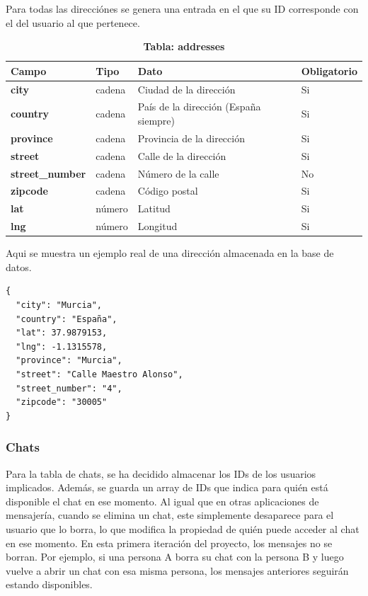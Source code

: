\documentclass[a4paper, 12pt]{article}
\begin{document}
Para todas las direcciónes se genera una entrada en el que su ID corresponde con el del usuario al que pertenece.

\begin{table}[H]
\captionsetup{justification=raggedright,singlelinecheck=false}
\caption{\textbf{Tabla: addresses}}
\label{tab:Addresses}
	\begin{tabular}{|m{3cm}|m{2cm}|m{5cm}|m{3cm}|}
	\hline
	\textbf{Campo} & \textbf{Tipo} & \textbf{Dato} & \textbf{Obligatorio} \\ 
	\hline
	\textbf{city} & cadena & Ciudad de la dirección & Si \\ 
	\hline
	\textbf{country} & cadena & País de la dirección (España siempre) & Si\\ 
	\hline
	\textbf{province} &  cadena & Provincia de la dirección & Si \\ 
	\hline
	\textbf{street} &  cadena & Calle de la dirección & Si \\ 
	\hline
	\textbf{street\_number} &  cadena & Número de la calle & No\\ 
	\hline
	\textbf{zipcode} & cadena & Código postal & Si \\ 
	\hline
	\textbf{lat} & número & Latitud & Si \\ 
	\hline
	\textbf{lng} & número & Longitud & Si \\ 
	\hline
\end{tabular}
\end{table}

Aqui se muestra un ejemplo real de una dirección almacenada en la base de datos.

\begin{verbatim}
{
  "city": "Murcia",
  "country": "España",
  "lat": 37.9879153,
  "lng": -1.1315578,
  "province": "Murcia",
  "street": "Calle Maestro Alonso",
  "street_number": "4",
  "zipcode": "30005"
}
\end{verbatim}

\subsubsection{Chats}

Para la tabla de chats, se ha decidido almacenar los IDs de los usuarios implicados. Además, se guarda un array de IDs que indica para quién está disponible el chat en ese momento. Al igual que en otras aplicaciones de mensajería, cuando se elimina un chat, este simplemente desaparece para el usuario que lo borra, lo que modifica la propiedad de quién puede acceder al chat en ese momento. En esta primera iteración del proyecto, los mensajes no se borran. Por ejemplo, si una persona A borra su chat con la persona B y luego vuelve a abrir un chat con esa misma persona, los mensajes anteriores seguirán estando disponibles. 
\end{document}
